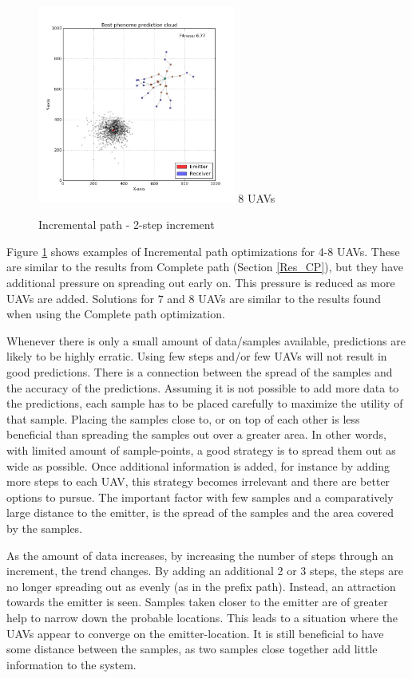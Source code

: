 \documentclass[10pt,a4paper]{book}
\begin{document}
\begin{figure}[H]
\begin{minipage}{60mm}
  \centering
  \includegraphics[width=65mm]{incr2steps/8uavs.jpg}
  8 \glspl{UAV}
\end{minipage}
\caption{Incremental path - 2-step increment}
\label{FIG_INCR_4_8}
\end{figure}


Figure \ref{FIG_INCR_4_8} shows examples of Incremental path optimizations for 4-8 \glspl{UAV}. These are similar to the results from Complete path (Section \ref{Res_CP}), but they have additional pressure on spreading out early on. This pressure is reduced as more \glspl{UAV} are added. Solutions for 7 and 8 \glspl{UAV} are similar to the results found when using the Complete path optimization.

\newpage

Whenever there is only a small amount of data/samples available, predictions are likely to be highly erratic. Using few steps and/or few \glspl{UAV} will not result in good predictions. There is a connection between the spread of the samples and the accuracy of the predictions. Assuming it is not possible to add more data to the predictions, each sample has to be placed carefully to maximize the utility of that sample. Placing the samples close to, or on top of each other is less beneficial than spreading the samples out over a greater area. In other words, with limited amount of sample-points, a good strategy is to spread them out as wide as possible. Once additional information is added, for instance by adding more steps to each \gls{UAV}, this strategy becomes irrelevant and there are better options to pursue. The important factor with few samples and a comparatively large distance to the emitter, is the spread of the samples and the area covered by the samples.

As the amount of data increases, by increasing the number of steps through an increment, the trend changes. By adding an additional 2 or 3 steps, the steps are no longer spreading out as evenly (as in the prefix path). Instead, an attraction towards the emitter is seen. Samples taken closer to the emitter are of greater help to narrow down the probable locations. This leads to a situation where the \glspl{UAV} appear to converge on the emitter-location. It is still beneficial to have some distance between the samples, as two samples close together add little information to the system.
\end{document}
